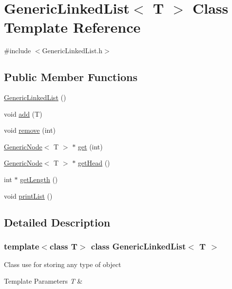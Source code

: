 \hypertarget{class_generic_linked_list}{}\section{Generic\+Linked\+List$<$ T $>$ Class Template Reference}
\label{class_generic_linked_list}


{\ttfamily \#include $<$Generic\+Linked\+List.\+h$>$}

\subsection*{Public Member Functions}
\begin{DoxyCompactItemize}
\item 
\mbox{\hyperlink{class_generic_linked_list_a033d33e112de0f2ebc71731433ae8be5}{Generic\+Linked\+List}} ()
\item 
void \mbox{\hyperlink{class_generic_linked_list_aa7191b3a33a7adda5d7bc9dd156b77d9}{add}} (T)
\item 
void \mbox{\hyperlink{class_generic_linked_list_aa22b730a9dfd611f0ba6c0704f5125b5}{remove}} (int)
\item 
\mbox{\hyperlink{class_generic_node}{Generic\+Node}}$<$ T $>$ $\ast$ \mbox{\hyperlink{class_generic_linked_list_a59b8bfebf18e1d167967ecfbe8172049}{get}} (int)
\item 
\mbox{\hyperlink{class_generic_node}{Generic\+Node}}$<$ T $>$ $\ast$ \mbox{\hyperlink{class_generic_linked_list_a8b21f9bbec56f257569e2c0eebee14d3}{get\+Head}} ()
\item 
int $\ast$ \mbox{\hyperlink{class_generic_linked_list_a73dcf0c040fee02a926ee1dbf2d84227}{get\+Length}} ()
\item 
void \mbox{\hyperlink{class_generic_linked_list_aeac472d4f88ca7a74d9507a1ea46e8a5}{print\+List}} ()
\end{DoxyCompactItemize}


\subsection{Detailed Description}
\subsubsection*{template$<$class T$>$\newline
class Generic\+Linked\+List$<$ T $>$}

Class use for storing any type of object 
\begin{DoxyTemplParams}{Template Parameters}
{\em T} & \\
\hline
\end{DoxyTemplParams}



